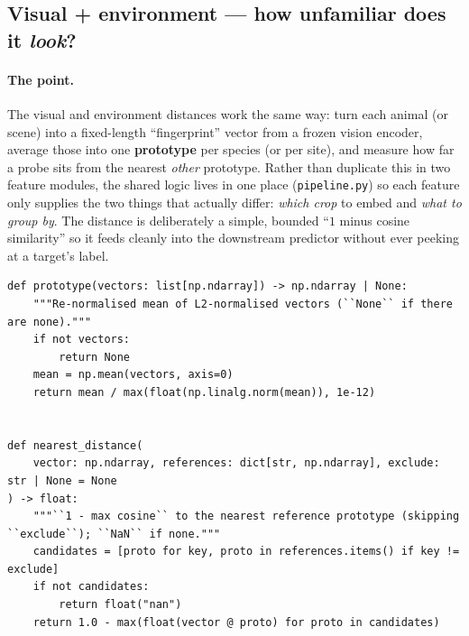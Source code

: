 \documentclass[11pt,a4paper]{article}
\newcommand{\code}[1]{\texttt{#1}}
\newcommand{\srcfile}[1]{\smallskip\noindent{\footnotesize\color{navy}\ttfamily\textbf{#1}}\par\nobreak\vspace{-0.15em}}
\begin{document}
\subsection*{Visual + environment --- how unfamiliar does it \emph{look}?}

\paragraph{The point.}
The visual and environment distances work the same way: turn each animal (or scene) into a fixed-length
``fingerprint'' vector from a frozen vision encoder, average those into one \textbf{prototype} per species
(or per site), and measure how far a probe sits from the nearest \emph{other} prototype. Rather than
duplicate this in two feature modules, the shared logic lives in one place (\code{pipeline.py}) so each
feature only supplies the two things that actually differ: \emph{which crop} to embed and \emph{what to
group by}. The distance is deliberately a simple, bounded ``$1$ minus cosine similarity'' so it feeds
cleanly into the downstream predictor without ever peeking at a target's label.

\srcfile{src/features/pipeline.py}
\begin{lstlisting}[style=py]
def prototype(vectors: list[np.ndarray]) -> np.ndarray | None:
    """Re-normalised mean of L2-normalised vectors (``None`` if there are none)."""
    if not vectors:
        return None
    mean = np.mean(vectors, axis=0)
    return mean / max(float(np.linalg.norm(mean)), 1e-12)


def nearest_distance(
    vector: np.ndarray, references: dict[str, np.ndarray], exclude: str | None = None
) -> float:
    """``1 - max cosine`` to the nearest reference prototype (skipping ``exclude``); ``NaN`` if none."""
    candidates = [proto for key, proto in references.items() if key != exclude]
    if not candidates:
        return float("nan")
    return 1.0 - max(float(vector @ proto) for proto in candidates)
\end{lstlisting}
\end{document}
